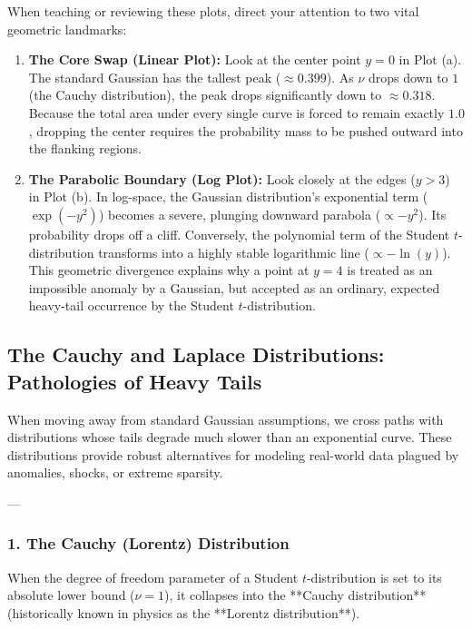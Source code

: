 \documentclass{article}
\begin{document}
\begin{tcolorbox}[colback=blue!5!white, colframe=blue!60!black, title=Analytical Insights from the Visualizations]
When teaching or reviewing these plots, direct your attention to two vital geometric landmarks:
\begin{enumerate}
    \item \textbf{The Core Swap (Linear Plot):} Look at the center point $y=0$ in Plot (a). The standard Gaussian has the tallest peak ($\approx 0.399$). As $\nu$ drops down to $1$ (the Cauchy distribution), the peak drops significantly down to $\approx 0.318$. Because the total area under every single curve is forced to remain exactly $1.0$, dropping the center requires the probability mass to be pushed outward into the flanking regions.
    \item \textbf{The Parabolic Boundary (Log Plot):} Look closely at the edges ($y > 3$) in Plot (b). In log-space, the Gaussian distribution's exponential term ($\exp(-y^2)$) becomes a severe, plunging downward parabola ($\propto -y^2$). Its probability drops off a cliff. Conversely, the polynomial term of the Student $t$-distribution transforms into a highly stable logarithmic line ($\propto -\ln(y)$). This geometric divergence explains why a point at $y=4$ is treated as an impossible anomaly by a Gaussian, but accepted as an ordinary, expected heavy-tail occurrence by the Student $t$-distribution.
\end{enumerate}
\end{tcolorbox}

\subsection*{The Cauchy and Laplace Distributions: Pathologies of Heavy Tails}

When moving away from standard Gaussian assumptions, we cross paths with distributions whose tails degrade much slower than an exponential curve. These distributions provide robust alternatives for modeling real-world data plagued by anomalies, shocks, or extreme sparsity.

---

\subsubsection*{1. The Cauchy (Lorentz) Distribution}

When the degree of freedom parameter of a Student $t$-distribution is set to its absolute lower bound ($\nu = 1$), it collapses into the **Cauchy distribution** (historically known in physics as the **Lorentz distribution**). 
\end{document}
